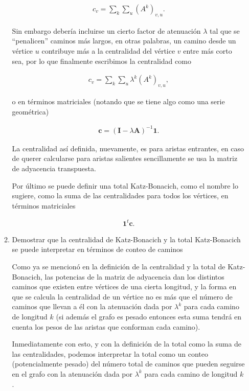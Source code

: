 \documentclass[answers]{exam}
\begin{document}
\begin{questions}
\begin{enumerate}
\begin{enumerate}
\begin{solution}
\begin{align*}
    c_v = \sum_k\sum_u(A^k)_{v,u}.
\end{align*}

Sin embargo debería incluirse un cierto factor de atenuación $\lambda$ tal que se ``penalicen'' caminos más largos, en otras palabras, un camino desde un vértice $u$ contribuye más a la centralidad del vértice $v$ entre más corto sea, por lo que finalmente escribimos la centralidad como

\begin{align*}
    c_v = \sum_k\sum_u\lambda^k(A^k)_{v,u},
\end{align*}

o en términos matriciales (notando que se tiene algo como una serie geométrica)

\begin{align*}
    \mathbf{c} = (\mathbf{I} - \lambda\mathbf{A})^{-1}\mathbf{1}.
\end{align*}

La centralidad así definida, nuevamente, es para aristas entrantes, en caso de querer calcularse para aristas salientes sencillamente se usa la matriz de adyacencia transpuesta.

Por último se puede definir una total Katz-Bonacich, como el nombre lo sugiere, como la suma de las centralidades para todos los vértices, en términos matriciales

\begin{align*}
    \mathbf{1}^t\mathbf{c}.
\end{align*}
\end{solution}

\item Demostrar que la centralidad de Katz-Bonacich y la total Katz-Bonacich se puede interpretar en términos de conteo de caminos

\begin{solution}
Como ya se mencionó en la definición de la centralidad y la total de Katz-Bonacich, las potencias de la matriz de adyacencia dan los distintos caminos que existen entre vértices de una cierta longitud, y la forma en que se calcula la centralidad de un vértice no es más que el número de caminos que llevan a él con la atenuación dada por $\lambda^k$ para cada camino de longitud $k$ (si además el grafo es pesado entonces esta suma tendrá en cuenta los pesos de las aristas que conforman cada camino).

Inmediatamente con esto, y con la definición de la total como la suma de las centralidades, podemos interpretar la total como un conteo (potencialmente pesado) del número total de caminos que pueden seguirse en el grafo con la atenuación dada por $\lambda^k$ para cada camino de longitud $k$.
\end{solution}


\end{enumerate}
\end{enumerate}
\end{questions}
\end{document}

